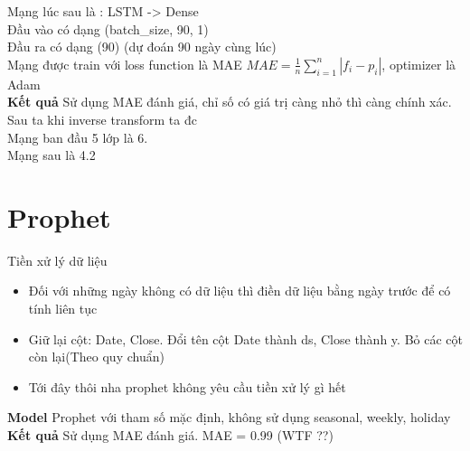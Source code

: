     Mạng lúc sau là : LSTM -> Dense \\
    Đầu vào có dạng (batch\_size, 90, 1) \\
    Đầu ra có dạng (90) (dự đoán 90 ngày cùng lúc) \\
    Mạng được train với loss function là MAE \(MAE = \frac{1}{n}\sum_{i=1}^{n}|f_i - p_i|\), optimizer là Adam \\
\textbf{Kết quả}
    Sử dụng MAE đánh giá, chỉ số có giá trị càng nhỏ thì càng chính xác. Sau ta khi inverse transform ta đc \\
    Mạng ban đầu 5 lớp là 6. \\
    Mạng sau là 4.2 \\

\section{Prophet}
Tiền xử lý dữ liệu
\begin{itemize}
    \item Đối với những ngày không có dữ liệu thì điền dữ liệu bằng ngày trước để có tính liên tục \\
    \item Giữ lại cột: Date, Close. Đổi tên cột Date thành ds, Close thành y. Bỏ các cột còn lại(Theo quy chuẩn) \\
    \item Tới đây thôi nha prophet không yêu cầu tiền xử lý gì hết \\
\end{itemize}
\textbf{Model}
Prophet với tham số mặc định, không sử dụng seasonal, weekly, holiday \\
\textbf{Kết quả}
Sử dụng MAE đánh giá. MAE = 0.99 (WTF ??)
